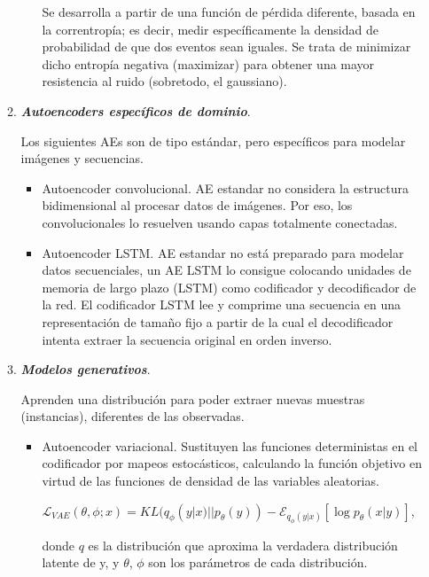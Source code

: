 \begin{enumerate}
\begin{enumerate}
\begin{enumerate}
                Se desarrolla a partir de una función de pérdida diferente, basada en la correntropía; es decir, medir específicamente la densidad de probabilidad de que dos eventos sean iguales. Se trata de minimizar dicho entropía negativa (maximizar) para obtener una mayor resistencia al ruido (sobretodo, el gaussiano).
                
            \end{enumerate}
            \newpage
            
            \item \textit{\textbf{Autoencoders específicos de dominio}}.
            \par Los siguientes AEs son de tipo estándar, pero específicos para modelar imágenes y secuencias.
            
            \begin{itemize}
                \item Autoencoder convolucional. AE estandar no considera la estructura bidimensional al procesar datos de imágenes. Por eso, los convolucionales lo resuelven usando capas totalmente conectadas. 
                
                \item Autoencoder LSTM. AE estandar no está preparado para modelar datos secuenciales, un AE LSTM lo consigue colocando unidades de memoria de largo plazo (LSTM) como codificador y decodificador de la red. El codificador
                LSTM lee y comprime una secuencia en una representación de tamaño fijo
                a partir de la cual el decodificador intenta extraer la secuencia original en
                orden inverso.
            \end{itemize}
            
        \item \textit{\textbf{Modelos generativos}}.
        \par Aprenden una distribución para poder extraer nuevas muestras (instancias), diferentes de las observadas. 
        
        \begin{itemize}
            \item Autoencoder variacional. Sustituyen las funciones deterministas en el codificador por mapeos estocásticos, calculando la función objetivo en virtud de las funciones de densidad de las variables aleatorias. 
            
            \begin{center}
                $\mathcal{L}_{VAE}(\theta,\phi;x) = KL(q_{\phi}(y|x)||p_{\theta}(y)) - \mathcal{E}_{q_{\phi}(y|x)}[\log p_{\theta}(x|y)]$,
            \end{center}
            donde $q$ es la distribución que aproxima la verdadera distribución latente de y, y $\theta$, $\phi$ son los parámetros de cada distribución.
            

\end{itemize}
\end{enumerate}
\end{enumerate}
